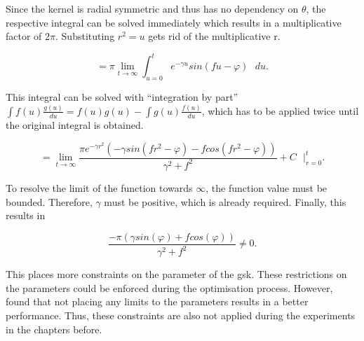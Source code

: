 \documentclass[./\jobname.tex]{subfiles}
\begin{document}
Since the kernel is radial symmetric and thus has no dependency on $\theta$, the respective integral can be solved immediately which results in a multiplicative factor of $2 \pi$. 
Substituting $r^2 = u$ gets rid of the multiplicative r. 

\begin{equation}
= \pi \lim_{t \to \infty} \int_{u=0}^{t} e^{-\gamma u } sin(f u - \varphi) \text{ } du.
\end{equation}

This integral can be solved with ``integration by part'' $\int f(u) \frac{g(u)}{du} = f(u) g(u) - \int g(u) \frac{f(u)}{du}$, which has to be applied twice until the original integral is obtained. 

\begin{equation}
= \lim_{t \to \infty} \frac{\pi e^{-\gamma r^2}(- \gamma sin(f r^2 - \varphi) - f cos(f r^2 - \varphi))}{ \gamma^2 + f^2} + C \text{ } \Bigg|_{r=0}^{t}.
\end{equation}

To resolve the limit of the function towards $\infty$, the function value must be bounded. Therefore, $\gamma$ must be positive, which is already required. Finally, this results in 

\begin{equation}
	\frac{-\pi (\gamma sin(\varphi) + f cos(\varphi))}{\gamma^2 + f^2} \neq 0.
\end{equation}

This places more constraints on the parameter of the \gls{gsk}. These restrictions on the parameters could be enforced during the optimisation process. However, \cite{chaquet_using_2019} found that not placing any limits to the parameters results in a better performance. Thus, these constraints are also not applied during the experiments in the chapters before. 
\end{document}
